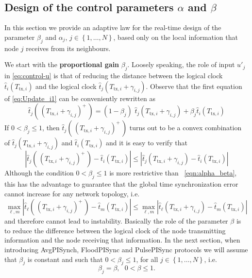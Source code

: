 \documentclass[english,a4paper,10pt,final]{article}
\numberwithin{equation}{section}
\numberwithin{figure}{section}
\begin{document}
\subsection{Design of the control parameters $\alpha$ and $\beta$}
\label{sec:parameter-adaptation}

In this section we provide an adaptive law for the real-time design of the parameter $\beta_j$ and $\alpha_j$, $j \in \left\{1,\ldots,N\right\}$, based only on the local information that node $j$ receives from its neighbours. 

We start with the \textbf{proportional gain} $\beta_j$. Loosely speaking, the role of input $u'_j$ in \eqref{eq:control-u} is that of reducing the distance between the logical clock $\hat{t}_i(T_{\mathrm{tx},i})$ and the logical clock $\hat{t}_j \left(T_{\mathrm{tx},i}+\gamma_{i,j}\right)$. Observe that the first equation of \eqref{eq:Update_i1} can be conveniently rewritten as
$$
\hat{t}_j (\,\left(T_{\mathrm{tx},i}+\gamma_{i,j}\right)^+\,) = (1-\beta_j)\,\,\hat{t}_j(T_{\mathrm{tx},i}+\gamma_{i,j}) +  \beta_j  \hat{t}_i(T_{\mathrm{tx},i})
$$
If 
$0< \beta_j \leq 1$, then $\hat{t}_j(\,\left(T_{\mathrm{tx},i}+\gamma_{i,j}\right)^+\,)$ turns out to be a convex combination of $\hat{t}_j(T_{\mathrm{tx},i}+\gamma_{i,j})$ and $\hat{t}_i(T_{\mathrm{tx},i})$ and it is easy to verify that
$$
|\hat{t}_j\left(\,(T_{\mathrm{tx},i}+\gamma_{i,j})^+\,\right) - \hat{t}_i(T_{\mathrm{tx},i})| \leq |\hat{t}_j(T_{\mathrm{tx},i}+\gamma_{i,j})  - \hat{t}_i(T_{\mathrm{tx},i})|
$$
Although the condition $0< \beta_j \leq 1$ is more restrictive than ~\eqref{eqn:alpha_beta}, this has the advantage to guarantee that the global time synchronization error cannot increase for any network topology, i.e.
$$
\max_{\ell,m}|\hat{t}_\ell\left(\,(T_{\mathrm{tx},i}+\gamma_{i,j})^+\,\right) - \hat{t}_m(T_{\mathrm{tx},i})| \leq \max_{\ell,m} |\hat{t}_\ell(T_{\mathrm{tx},i}+\gamma_{i,j})  - \hat{t}_m(T_{\mathrm{tx},i})|
$$
 and therefore cannot lead to instability. Basically the role of the parameter $\beta$ is to reduce the difference between the logical clock of the node transmitting information and the node receiving that information.
 In the next section, when introducing AvgPISynch, FloodPISync and PulsePISync protocols we will assume that $\beta_j$ is constant and such that $0< \beta_j \leq 1$, for all $j \in \left\{1,\ldots,N\right\}$, i.e.
 \begin{equation}\label{eqn:beta_global}
\beta_j=\beta, \ \ \ 0< \beta \leq 1.
\end{equation}
\end{document}
